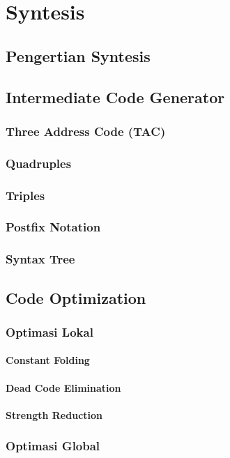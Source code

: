 \documentclass{book}
\begin{document}
\chapter{Syntesis}
    \section{Pengertian Syntesis}
    \section{Intermediate Code Generator}
         \subsection{Three Address Code (TAC)}
         \subsection{Quadruples}
         \subsection{Triples}
         \subsection{Postfix Notation}
         \subsection{Syntax Tree}
    \section{Code Optimization}
         \subsection{Optimasi Lokal}
              \subsubsection{Constant Folding}
              \subsubsection{Dead Code Elimination}
              \subsubsection{Strength Reduction}
         \subsection{Optimasi Global}
\end{document}
